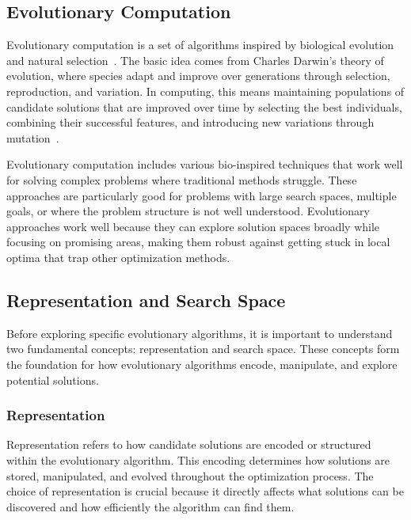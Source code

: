 \documentclass[a4paper,12pt]{article}
\begin{document}
\subsection{Evolutionary Computation}
Evolutionary computation is a set of algorithms inspired by biological evolution and natural selection~\cite{Koza}. 
The basic idea comes from Charles Darwin's theory of evolution, where species adapt and improve over generations through 
selection, reproduction, and variation. In computing, this means maintaining populations of candidate solutions that are 
improved over time by selecting the best individuals, combining their successful features, and introducing new variations 
through mutation~\cite{GPTut}.

Evolutionary computation includes various bio-inspired techniques that work well for solving complex problems where traditional 
methods struggle. These approaches are particularly good for problems with large search spaces, multiple goals, or where the 
problem structure is not well understood. Evolutionary approaches work well because they can explore solution spaces broadly 
while focusing on promising areas, making them robust against getting stuck in local optima that trap other optimization methods.~\cite{EAs}

\subsection{Representation and Search Space}
Before exploring specific evolutionary algorithms, it is important to understand two fundamental concepts: representation and search space. 
These concepts form the foundation for how evolutionary algorithms encode, manipulate, and explore potential solutions.

\subsubsection{Representation}
Representation refers to how candidate solutions are encoded or structured within the evolutionary algorithm. 
This encoding determines how solutions are stored, manipulated, and evolved throughout the optimization process. 
The choice of representation is crucial because it directly affects what solutions can be discovered and how efficiently the algorithm can find them.
\end{document}
